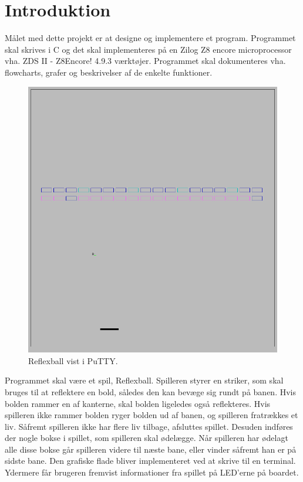 \section{Introduktion}
Målet med dette projekt er at designe og implementere et program. Programmet skal skrives i C og det skal implementeres på en Zilog Z8 encore microprocessor vha. ZDS II - Z8Encore! 4.9.3 værktøjer. Programmet skal dokumenteres vha. flowcharts, grafer og beskrivelser af de enkelte funktioner.

\begin{figure}[h]
\begin{center}
\includegraphics[scale=0.5]{img/gameplay.png}
\caption{Reflexball vist i PuTTY.}
\end{center}
\end{figure}

Programmet skal være et spil, Reflexball. Spilleren styrer en striker, som skal bruges til at reflektere en bold, således den kan bevæge sig rundt på banen. Hvis bolden rammer en af kanterne, skal bolden ligeledes også reflekteres. Hvis spilleren ikke rammer bolden ryger bolden ud af banen, og spilleren fratrækkes et liv. Såfremt spilleren ikke har flere liv tilbage, afsluttes spillet. Desuden indføres der nogle bokse i spillet, som spilleren skal ødelægge. Når spilleren har ødelagt alle disse bokse går spilleren videre til næste bane, eller vinder såfremt han er på sidste bane. Den grafiske flade bliver implementeret ved at skrive til en terminal. Ydermere får brugeren fremvist informationer fra spillet på LED'erne på boardet.





 
